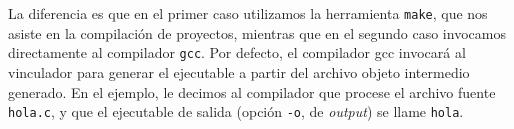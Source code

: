 La diferencia es que en el primer caso utilizamos la herramienta \texttt{make}, que nos asiste en la compilación de proyectos,
mientras que en el segundo caso invocamos directamente al compilador \texttt{gcc}. Por defecto, el compilador gcc invocará al vinculador para generar el ejecutable a partir del archivo objeto intermedio generado. En el ejemplo, le decimos al compilador que procese el archivo fuente \texttt{hola.c}, y que el ejecutable de salida (opción \texttt{-o}, de \textit{output}) se llame \texttt{hola}. 




